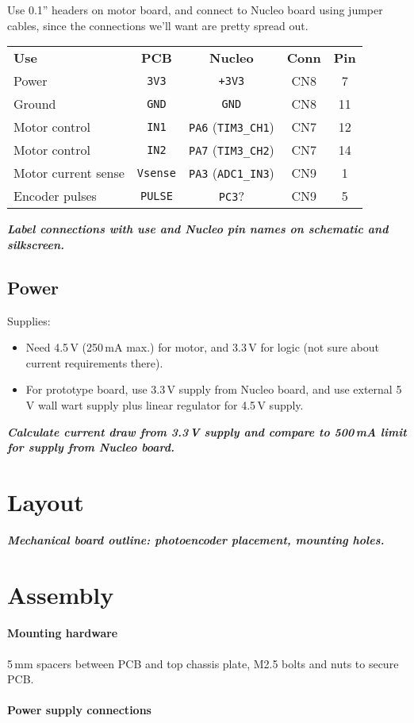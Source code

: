 \documentclass[a4paper,11pt,article]{memoir}
\newcommand{\todo}[1]{{\color{red}\textit{\textbf{#1}}}}
\begin{document}
Use 0.1'' headers on motor board, and connect to Nucleo board using
jumper cables, since the connections we'll want are pretty spread out.

\begin{center}
  \begin{tabular}{lcccc}
    \textbf{Use} & \textbf{PCB} & \textbf{Nucleo} & \textbf{Conn} & \textbf{Pin} \\
    Power  & \texttt{3V3} & \texttt{+3V3} & CN8 & 7\\
    Ground & \texttt{GND} & \texttt{GND} & CN8 & 11 \\
    Motor control & \texttt{IN1} & \texttt{PA6} (\texttt{TIM3\_CH1}) & CN7 & 12 \\
    Motor control & \texttt{IN2} & \texttt{PA7} (\texttt{TIM3\_CH2}) & CN7 & 14 \\
    Motor current sense & \texttt{Vsense} & \texttt{PA3} (\texttt{ADC1\_IN3}) & CN9 & 1 \\
    Encoder pulses & \texttt{PULSE} & \texttt{PC3}? & CN9 & 5 \\
  \end{tabular}
\end{center}

\todo{Label connections with use and Nucleo pin names on schematic and
  silkscreen.}

\subsection*{Power}

Supplies:
\begin{itemize}
  \item{Need 4.5\,V (250\,mA max.) for motor, and 3.3\,V for logic
    (not sure about current requirements there).}
  \item{For prototype board, use 3.3\,V supply from Nucleo board, and
    use external 5\,V wall wart supply plus linear regulator for
    4.5\,V supply.}
\end{itemize}

\todo{Calculate current draw from 3.3\,V supply and compare to 500\,mA
limit for supply from Nucleo board.}


\section*{Layout}

\todo{Mechanical board outline: photoencoder placement, mounting
  holes.}


\section*{Assembly}

\paragraph{Mounting hardware}

5\,mm spacers between PCB and top chassis plate, M2.5 bolts and nuts
to secure PCB.

\paragraph{Power supply connections}
\end{document}
